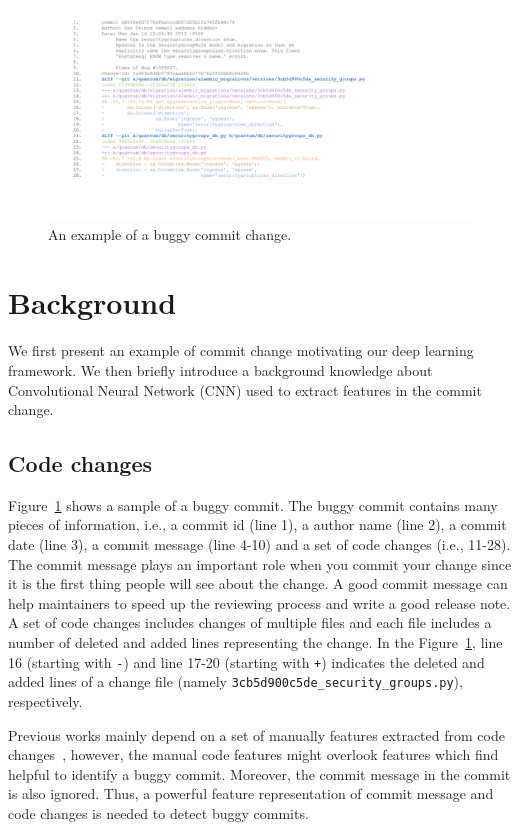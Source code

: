 \begin{figure}[ht]
\center
\includegraphics[scale=0.16]{figs/example.pdf}
\caption{An example of a buggy commit change.}
\label{fig:example}
\end{figure} 

\section{Background}
\label{sec:background}

We first present an example of commit change motivating our deep learning framework. We then briefly introduce a background knowledge about Convolutional Neural Network (CNN) used to extract features in the commit change. 

\subsection{Code changes}\label{sec:examle}

Figure~\ref{fig:example} shows a sample of a buggy commit. The buggy commit contains many pieces of information, i.e., a commit id (line 1), a author name (line 2), a commit date (line 3), a commit message (line 4-10) and a set of code changes (i.e., 11-28). The commit message plays an important role when you commit your change since it is the first thing people will see about the change. A good commit message can help maintainers to speed up the reviewing process and write a good release note. A set of code changes includes changes of multiple files and each file includes a number of deleted and added lines representing the change. In the Figure~\ref{fig:example}, line 16 (starting with \texttt{-}) and line 17-20 (starting with \texttt{+}) indicates the deleted and added lines of a change file (namely \texttt{3cb5d900c5de\_security\_groups.py}), respectively. 

Previous works mainly depend on a set of manually features extracted from code changes~\cite{Yang:2015:DLJ, mcintosh2018fix}, however, the manual code features might overlook features which find helpful to identify a buggy commit. Moreover, the commit message in the commit is also ignored. Thus, a powerful feature representation of commit message and code changes is needed to detect buggy commits. 

